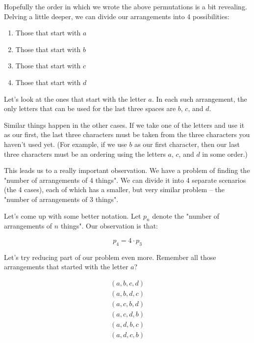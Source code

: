 Hopefully the order in which we wrote the above permutations is a bit revealing. Delving a little deeper, we can divide our arrangements into 4 possibilities:

\begin{enumerate}
\item Those that start with $a$
\item Those that start with $b$
\item Those that start with $c$
\item Those that start with $d$
\end{enumerate}

Let's look at the ones that start with the letter $a$. In each such arrangement, the only letters that can be used for the last three spaces are $b$, $c$, and $d$. 

Similar things happen in the other cases. If we take one of the letters and use it as our first, the last three characters must be taken from the three characters you haven't used yet. (For example, if we use $b$ as our first character, then our last three characters must be an ordering using the letters $a$, $c$, and $d$ in some order.) %

This leads us to a really important observation. We have a problem of finding the "number of arrangements of 4 things". We can divide it into 4 separate scenarios (the 4 cases), each of which has a smaller, but very similar problem -- the "number of arrangements of 3 things". 

Let's come up with some better notation. Let $p_n$ denote the "number of arrangements of $n$ things". Our observation is that:

\begin{equation*}
p_4 = 4 \cdot p_3
\end{equation*}


Let's try reducing part of our problem even more. Remember all those arrangements that started with the letter $a$?

\begin{gather*}
(a, b, c, d) \\
(a, b, d, c) \\
(a, c, b, d) \\
(a, c, d, b) \\
(a, d, b, c) \\
(a, d, c, b) \\
\end{gather*}

